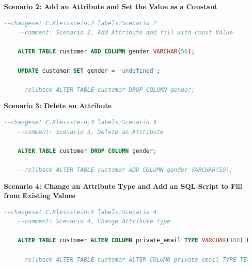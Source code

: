 \textbf{Scenario 2: Add an Attribute and Set the Value as a Constant}\\
%
\begin{lstlisting}[language=SQL, caption={SQL Changeset Scenario 2: Add an Attribute and Set the Value as a Constant}, label=list:scenarions:LiquibaseSQLScen2]
	--changeset C.Kleinstein:2 labels:Scenario 2
	--comment: Scenario 2, Add Attribute and fill with const Value
	
	ALTER TABLE customer ADD COLUMN gender VARCHAR(50);
	
	UPDATE customer SET gender = 'undefined';
	
	--rollback ALTER TABLE customer DROP COLUMN gender;
\end{lstlisting}

\textbf{Scenario 3: Delete an Attribute}\\
%
\begin{lstlisting}[language=SQL, caption={SQL Changeset Scenario 3: Delete an Attribute}, label=list:scenarions:LiquibaseSQLScen3]
	--changeset C.Kleinstein:3 labels:Scenario 3
	--comment: Scenario 3, Delete an Attribute
	
	ALTER TABLE customer DROP COLUMN gender;
	
	--rollback ALTER TABLE customer ADD COLUMN gender VARCHAR(50);
\end{lstlisting}

\textbf{Scenario 4: Change an Attribute Type and Add an SQL Script to Fill from Existing Values}\\
%
\begin{lstlisting}[language=SQL, caption={SQL Changeset Scenario 4: Change an Attribute Type and Add an SQL Script to Fill from Existing Values}, label=list:scenarions:LiquibaseSQLScen4]
	--changeset C.Kleinstein:4 labels:Scenario 4
	--comment: Scenario 4, Change Attribute type
	
	ALTER TABLE customer ALTER COLUMN private_email TYPE VARCHAR(100) USING private_email::varchar;
	
	--rollback ALTER TABLE customer ALTER COLUMN private_email TYPE TEXT USING private_email::text;
\end{lstlisting}

